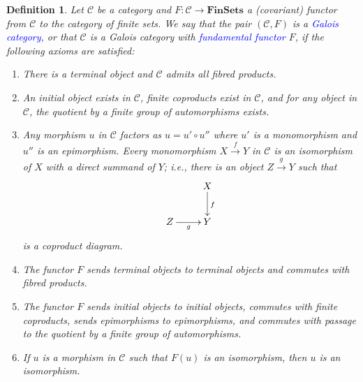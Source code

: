 \documentclass[10pt]{article}
\theoremstyle{thmstyle}
\theoremstyle{defstyle}
\newtheorem{definition}[theorem]{Definition}
\newcommand{\catFinSets}{\mathbf{FinSets}}
\newcommand{\scrC}{\mathscr{C}} %
\newcommand{\define}[1]{\textcolor{blue}{\textit{#1}}}
\begin{document}
\begin{definition}
    Let $\scrC$ be a category and $F:\scrC\to\catFinSets$ a (covariant) functor from $\scrC$ to the category of finite sets. We say that the pair $(\scrC, F)$ is a \define{Galois category}, or that $\scrC$ is a Galois category with \define{fundamental functor} $F$, if the following axioms are satisfied: 
    \begin{enumerate}[label=\textbf{(G\arabic*)}]
        \item There is a terminal object and $\scrC$ admits all fibred products. \label{G1}
        \item An initial object exists in $\scrC$, finite coproducts exist in $\scrC$, and for any object in $\scrC$, the quotient by a finite group of automorphisms exists. \label{G2}
        \item Any morphism $u$ in $\scrC$ factors as $u = u'\circ u''$ where $u'$ is a monomorphism and $u''$ is an epimorphism. 
        Every monomorphism $X\xrightarrow{f} Y$ in $\scrC$ is an isomorphism of $X$ with a direct summand of $Y$; i.e., there is an object $Z\xrightarrow{g} Y$ such that 
        \begin{equation*}
            \xymatrix {
                & X\ar[d]^f\\
                Z\ar[r]_g & Y
            }
        \end{equation*}
        is a coproduct diagram. \label{G3}
        \item The functor $F$ sends terminal objects to terminal objects and commutes with fibred products. \label{G4}
        \item The functor $F$ sends initial objects to initial objects, commutes with finite coproducts, sends epimorphisms to epimorphisms, and commutes with passage to the quotient by a finite group of automorphisms. \label{G5}
        \item If $u$ is a morphism in $\scrC$ such that $F(u)$ is an isomorphism, then $u$ is an isomorphism. \label{G6}
    \end{enumerate}
\end{definition}
\end{document}
